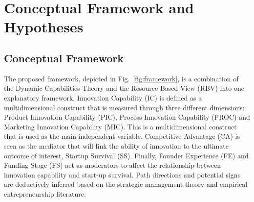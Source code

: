 \documentclass{ieeeaccess}
\begin{document}
\section{Conceptual Framework and Hypotheses}
\label{sec:framework}

\subsection{Conceptual Framework}

The proposed framework, depicted in Fig.~\ref{fig:framework}, is a combination of the Dynamic Capabilities Theory and the Resource Based View (RBV) into one explanatory framework. Innovation Capability (IC) is defined as a multidimensional construct that is measured through three different dimensions: Product Innovation Capability (PIC), Process Innovation Capability (PROC) and Marketing Innovation Capability (MIC). This is a multidimensional construct that is used as the main independent variable. Competitive Advantage (CA) is seen as the mediator that will link the ability of innovation to the ultimate outcome of interest, Startup Survival (SS). Finally, Founder Experience (FE) and Funding Stage (FS) act as moderators to affect the relationship between innovation capability and start-up survival. Path directions and potential signs are deductively inferred based on the strategic management theory and empirical entrepreneurship literature.
\end{document}
